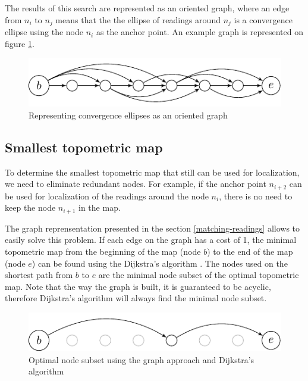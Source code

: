 \documentclass[letterpaper,10 pt,conference]{ieeeconf}
\begin{document}
The results of this search are represented as an oriented graph, where an edge from $n_{i}$ to
$n_{j}$ means that the the ellipse of readings around $n_{j}$ is a convergence ellipse using the
node $n_i$ as the anchor point. An example graph is represented on figure \ref{graph_unoptimized}.

\begin{figure}[thpb]
  \centering
  \includegraphics[scale=1.0]{unoptimized-graph}
  \caption{Representing convergence ellipses as an oriented graph}
  \label{graph_unoptimized}
\end{figure}


\subsection{Smallest topometric map}

To determine the smallest topometric map that still can be used for localization, we need to
eliminate redundant nodes.  For example, if the anchor point $n_{i+2}$ can be used for localization
of the readings around the node $n_i$, there is no need to keep the node $n_{i+1}$ in the map.

The graph reprensentation presented in the section \ref{matching-readings} allows to easily solve
this problem. If each edge on the graph has a cost of 1, the minimal topometric map from the
beginning of the map (node $b$) to the end of the map (node $e$) can be found using the Dijkstra's
algorithm \cite{dijkstra}. The nodes used on the shortest path from $b$ to $e$ are the minimal node
subset of the optimal topometric map. Note that the way the graph is built, it is guaranteed to be
acyclic, therefore Dijkstra's algorithm will always find the minimal node subset.


\begin{figure}[thpb]
  \centering
  \includegraphics[scale=1.0]{optimized-graph}
  \caption{Optimal node subset using the graph approach and Dijkstra's algorithm}
\end{figure}
\end{document}
